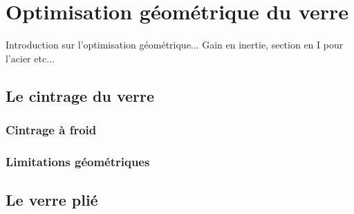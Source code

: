 \documentclass[11pt,titlepage]{article}
\begin{document}
\newpage

\section{Optimisation géométrique du verre}

Introduction sur l'optimisation géométrique... Gain en inertie, section en I pour l'acier etc...

\subsection{Le cintrage du verre}

\subsubsection{Cintrage à froid}

\subsubsection{Limitations géométriques}

\subsection{Le verre plié}
\newpage
\end{document}
